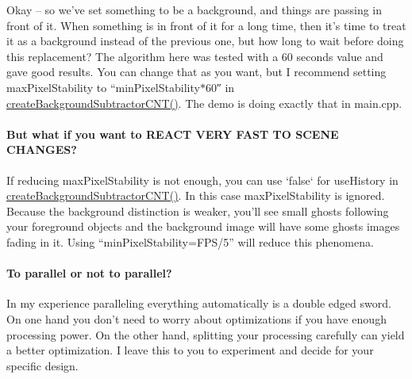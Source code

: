 Okay – so we’ve set something to be a background, and things are passing in front of it. When something is in front of it for a long time, then it’s time to treat it as a background instead of the previous one, but how long to wait before doing this replacement? The algorithm here was tested with a 60 seconds value and gave good results. You can change that as you want, but I recommend setting max\+Pixel\+Stability to “min\+Pixel\+Stability$\ast$60″ in \hyperlink{bgsubcnt_8h_a6a6efd913954320be33f39c32a4c5a7e}{create\+Background\+Subtractor\+C\+N\+T()}. The demo is doing exactly that in main.\+cpp.

\paragraph*{But what if you want to R\+E\+A\+CT V\+E\+RY F\+A\+ST TO S\+C\+E\+NE C\+H\+A\+N\+G\+ES?}

If reducing max\+Pixel\+Stability is not enough, you can use ‘false‘ for use\+History in \hyperlink{bgsubcnt_8h_a6a6efd913954320be33f39c32a4c5a7e}{create\+Background\+Subtractor\+C\+N\+T()}. In this case max\+Pixel\+Stability is ignored. Because the background distinction is weaker, you’ll see small ghosts following your foreground objects and the background image will have some ghosts images fading in it. Using “min\+Pixel\+Stability=F\+P\+S/5” will reduce this phenomena.

\paragraph*{To parallel or not to parallel?}

In my experience paralleling everything automatically is a double edged sword. On one hand you don’t need to worry about optimizations if you have enough processing power. On the other hand, splitting your processing carefully can yield a better optimization. I leave this to you to experiment and decide for your specific design. 